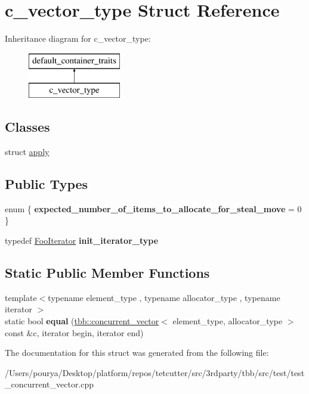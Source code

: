 \hypertarget{structc__vector__type}{}\section{c\+\_\+vector\+\_\+type Struct Reference}
\label{structc__vector__type}
Inheritance diagram for c\+\_\+vector\+\_\+type\+:\begin{figure}[H]
\begin{center}
\leavevmode
\includegraphics[height=2.000000cm]{structc__vector__type}
\end{center}
\end{figure}
\subsection*{Classes}
\begin{DoxyCompactItemize}
\item 
struct \hyperlink{structc__vector__type_1_1apply}{apply}
\end{DoxyCompactItemize}
\subsection*{Public Types}
\begin{DoxyCompactItemize}
\item 
\hypertarget{structc__vector__type_a7913c3e72eda3af02d901e22606bc19d}{}enum \{ {\bfseries expected\+\_\+number\+\_\+of\+\_\+items\+\_\+to\+\_\+allocate\+\_\+for\+\_\+steal\+\_\+move} = 0
 \}\label{structc__vector__type_a7913c3e72eda3af02d901e22606bc19d}

\item 
\hypertarget{structc__vector__type_aed4a9be6e884a9b98a3f0514f81c32c2}{}typedef \hyperlink{classFooIterator}{Foo\+Iterator} {\bfseries init\+\_\+iterator\+\_\+type}\label{structc__vector__type_aed4a9be6e884a9b98a3f0514f81c32c2}

\end{DoxyCompactItemize}
\subsection*{Static Public Member Functions}
\begin{DoxyCompactItemize}
\item 
\hypertarget{structc__vector__type_a5093bb00219ca1628d14f080b47dec7f}{}{\footnotesize template$<$typename element\+\_\+type , typename allocator\+\_\+type , typename iterator $>$ }\\static bool {\bfseries equal} (\hyperlink{classtbb_1_1concurrent__vector}{tbb\+::concurrent\+\_\+vector}$<$ element\+\_\+type, allocator\+\_\+type $>$ const \&c, iterator begin, iterator end)\label{structc__vector__type_a5093bb00219ca1628d14f080b47dec7f}

\end{DoxyCompactItemize}


The documentation for this struct was generated from the following file\+:\begin{DoxyCompactItemize}
\item 
/\+Users/pourya/\+Desktop/platform/repos/tetcutter/src/3rdparty/tbb/src/test/test\+\_\+concurrent\+\_\+vector.\+cpp\end{DoxyCompactItemize}
